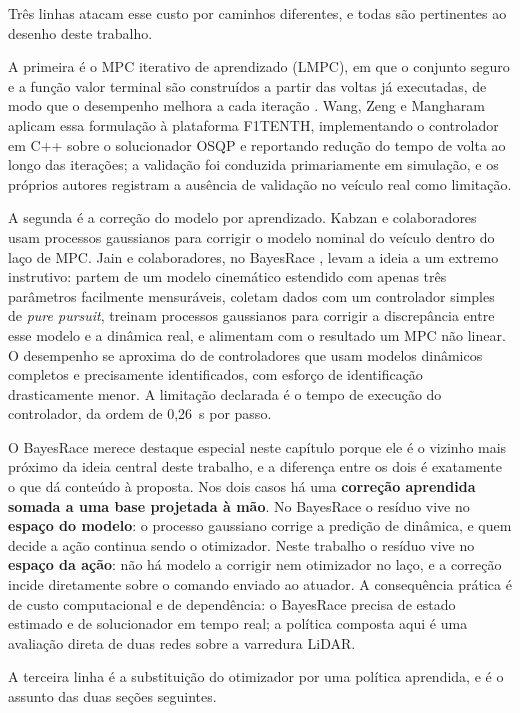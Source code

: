Três linhas atacam esse custo por caminhos diferentes, e todas são pertinentes
ao desenho deste trabalho.

A primeira é o MPC iterativo de aprendizado (LMPC), em que o conjunto seguro e a
função valor terminal são construídos a partir das voltas já executadas, de modo
que o desempenho melhora a cada iteração \cite{Rosolia2020LMPC}. Wang, Zeng e
Mangharam \cite{Wang2020LMPC} aplicam essa formulação à plataforma F1TENTH,
implementando o controlador em C++ sobre o solucionador OSQP e reportando
redução do tempo de volta ao longo das iterações; a validação foi conduzida
primariamente em simulação, e os próprios autores registram a ausência de
validação no veículo real como limitação.

A segunda é a correção do modelo por aprendizado. Kabzan e colaboradores
\cite{Kabzan2019LearningMPC} usam processos gaussianos para corrigir o modelo
nominal do veículo dentro do laço de MPC. Jain e colaboradores, no BayesRace
\cite{Jain2020Bayesrace}, levam a ideia a um extremo instrutivo: partem de um
modelo cinemático estendido com apenas três parâmetros facilmente mensuráveis,
coletam dados com um controlador simples de \textit{pure pursuit}, treinam
processos gaussianos para corrigir a discrepância entre esse modelo e a dinâmica
real, e alimentam com o resultado um MPC não linear. O desempenho se aproxima do
de controladores que usam modelos dinâmicos completos e precisamente
identificados, com esforço de identificação drasticamente menor. A limitação
declarada é o tempo de execução do controlador, da ordem de 0,26~s por passo.

O BayesRace merece destaque especial neste capítulo porque ele é o vizinho mais
próximo da ideia central deste trabalho, e a diferença entre os dois é exatamente
o que dá conteúdo à proposta. Nos dois casos há uma \textbf{correção aprendida
somada a uma base projetada à mão}. No BayesRace o resíduo vive no
\textbf{espaço do modelo}: o processo gaussiano corrige a predição de dinâmica, e
quem decide a ação continua sendo o otimizador. Neste trabalho o resíduo vive no
\textbf{espaço da ação}: não há modelo a corrigir nem otimizador no laço, e a
correção incide diretamente sobre o comando enviado ao atuador. A consequência
prática é de custo computacional e de dependência: o BayesRace precisa de estado
estimado e de solucionador em tempo real; a política composta aqui é uma
avaliação direta de duas redes sobre a varredura LiDAR.

A terceira linha é a substituição do otimizador por uma política aprendida, e é
o assunto das duas seções seguintes.

